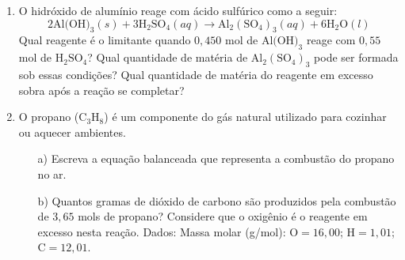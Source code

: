 \documentclass[a4paper, 12pt]{article}
\begin{document}
\begin{enumerate}

    \item O hidróxido de alumínio reage com ácido sulfúrico como a seguir:
          \[
              2\text{Al(OH)}_{3}(s) + 3\text{H}_{2}\text{SO}_{4}(aq) \rightarrow \text{Al}
              _{2}(\text{SO}_{4})_{3}(aq) + 6\text{H}_{2}\text{O}(l)
          \]
          Qual reagente é o limitante quando $0,450$ mol de $\text{Al(OH)}_{3}$
          reage com $0,55$ mol de $\text{H}_{2}\text{SO}_{4}$? Qual quantidade de matéria
          de $\text{Al}_{2}(\text{SO}_{4})_{3}$ pode ser formada sob essas condições?
          Qual quantidade de matéria do reagente em excesso sobra após a reação se
          completar?


    \item O propano ($\text{C}_{3}\text{H}_{8}$) é um componente do gás natural utilizado
          para cozinhar ou aquecer ambientes.
          \begin{enumerate}[align=left, labelsep=-0.5em]
              \item[a)] Escreva a equação balanceada que representa a combustão do propano
                    no ar.

              \item[b)] Quantos gramas de dióxido de carbono são produzidos pela combustão
                    de $3,65$ mols de propano? Considere que o oxigênio é o reagente em
                    excesso nesta reação. Dados: Massa molar (g/mol): $\text{O}= 16,00$;
                    $\text{H}= 1,01$; $\text{C}= 12,01$.
          \end{enumerate}
\end{enumerate}
\end{document}
